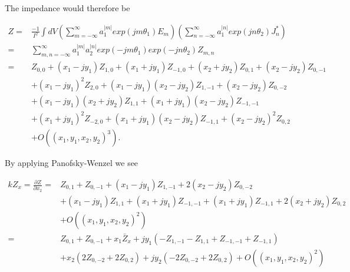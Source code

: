 The impedance would therefore be

\begin{align}
Z = &\frac{-1}{I^{2}} \int dV \left( \displaystyle\sum\limits^{\infty}_{m=-\infty} a_{1}^{|m|} exp \left( jm\theta_{1} \right) E_{m}\right) \left( \displaystyle\sum\limits^{\infty}_{n=-\infty} a_{1}^{|n|} exp \left( jn\theta_{2} \right) J^{*}_{n}\right) \nonumber \\
   = &\displaystyle\sum\limits^{\infty}_{m,n=-\infty} a_{1}^{|m|} a_{2}^{|n|} exp\left( -jm\theta_{1} \right) exp\left( -jn\theta_{2} \right) Z_{m,n} \nonumber \\
   = &Z_{0,0} + \left( x_{1}- jy_{1} \right)Z_{1,0} + \left( x_{1} + jy_{1} \right)Z_{-1,0} + \left( x_{2} + jy_{2} \right)Z_{0,1} +  \left( x_{2} - jy_{2} \right)Z_{0,-1} \nonumber \\
      & +\left( x_{1} - jy_{1} \right)^{2}Z_{2,0} +  \left( x_{1} - jy_{1} \right)\left( x_{2} - jy_{2} \right)Z_{1,-1} + \left( x_{2} - jy_{2} \right) Z_{0,-2} \nonumber \\
      & +\left( x_{1} - jy_{1} \right)\left( x_{2} + jy_{2} \right)Z_{1,1} + \left( x_{1} + jy_{1} \right) \left( x_{2} - jy_{2} \right) Z_{-1,-1} \nonumber \\
      & +\left( x_{1} + jy_{1} \right)^{2}Z_{-2,0} + \left( x_{1} + jy_{1} \right)\left( x_{2} - jy_{2} \right) Z_{-1,1} + \left( x_{2} - jy_{2} \right)^{2}Z_{0,2} \nonumber \\
      & +O\left( \left(  x_{1},y_{1},x_{2},y_{2} \right)^{3} \right).
\label{eqn:gen_imp}
\end{align}

By applying Panofsky-Wenzel we see

\begin{align}
kZ_{x} =\frac{\partial Z}{\partial x_{2}} = & Z_{0,1} + Z_{0,-1} + \left( x_{1} - jy_{1} \right) Z_{1,-1} + 2\left( x_{2} - jy_{2} \right) Z_{0,-2} \nonumber \\
						&+ \left( x_{1} - jy_{1} \right) Z_{1,1} + \left( x_{1} + jy_{1} \right) Z_{-1,-1} + \left( x_{1} + jy_{1} \right) Z_{-1,1} + 2\left( x_{2} + jy_{2} \right) Z_{0,2} \nonumber \\
						& + O\left( \left( x_{1},y_{1},x_{2},y_{2} \right)^{2} \right) \nonumber \\
						= & Z_{0,1} + Z_{0,-1} + x_{1}\bar{Z}_{x} + jy_{1} \left( -Z_{1,-1} - Z_{1,1} + Z_{-1,-1} + Z_{-1,1} \right) \nonumber \\
						& + x_{2}\left( 2Z_{0,-2} + 2Z_{0,2}  \right) + jy_{2}\left( -2Z_{0,-2} + 2Z_{0,2}  \right) +  O\left( \left( x_{1},y_{1},x_{2},y_{2} \right)^{2} \right)
\end{align}

